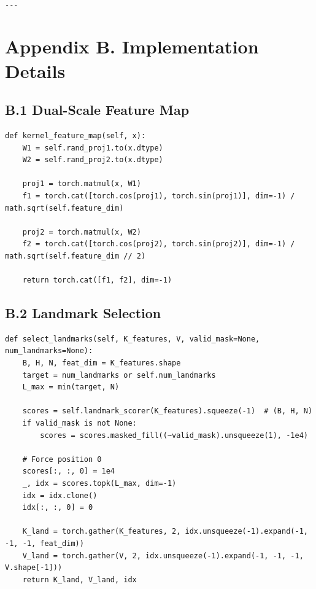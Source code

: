 \begin{lstlisting}

---
\end{lstlisting}

\section{Appendix B. Implementation Details}

\subsection{B.1 Dual-Scale Feature Map}

\begin{lstlisting}
def kernel_feature_map(self, x):
    W1 = self.rand_proj1.to(x.dtype)
    W2 = self.rand_proj2.to(x.dtype)
    
    proj1 = torch.matmul(x, W1)
    f1 = torch.cat([torch.cos(proj1), torch.sin(proj1)], dim=-1) / math.sqrt(self.feature_dim)
    
    proj2 = torch.matmul(x, W2)
    f2 = torch.cat([torch.cos(proj2), torch.sin(proj2)], dim=-1) / math.sqrt(self.feature_dim // 2)
    
    return torch.cat([f1, f2], dim=-1)
\end{lstlisting}

\subsection{B.2 Landmark Selection}

\begin{lstlisting}
def select_landmarks(self, K_features, V, valid_mask=None, num_landmarks=None):
    B, H, N, feat_dim = K_features.shape
    target = num_landmarks or self.num_landmarks
    L_max = min(target, N)
    
    scores = self.landmark_scorer(K_features).squeeze(-1)  # (B, H, N)
    if valid_mask is not None:
        scores = scores.masked_fill((~valid_mask).unsqueeze(1), -1e4)
    
    # Force position 0
    scores[:, :, 0] = 1e4
    _, idx = scores.topk(L_max, dim=-1)
    idx = idx.clone()
    idx[:, :, 0] = 0
    
    K_land = torch.gather(K_features, 2, idx.unsqueeze(-1).expand(-1, -1, -1, feat_dim))
    V_land = torch.gather(V, 2, idx.unsqueeze(-1).expand(-1, -1, -1, V.shape[-1]))
    return K_land, V_land, idx
\end{lstlisting}

